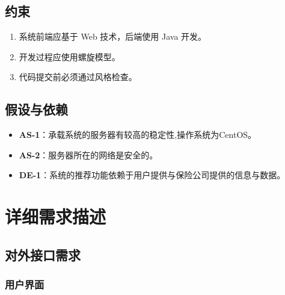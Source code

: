 \documentclass[a4paper]{ctexart}
\begin{document}
\subsection{约束}

\begin{enumerate}[label=CON\arabic*.]
  \item 系统前端应基于 Web 技术，后端使用 Java 开发。
  \item 开发过程应使用螺旋模型。
  \item 代码提交前必须通过风格检查。
\end{enumerate}

\subsection{假设与依赖}

\begin{itemize}
  \item \textbf{AS-1}：承载系统的服务器有较高的稳定性,操作系统为CentOS。
  \item \textbf{AS-2}：服务器所在的网络是安全的。
  \item \textbf{DE-1}：系统的推荐功能依赖于用户提供与保险公司提供的信息与数据。
\end{itemize}

\section{详细需求描述}

\subsection{对外接口需求}

\subsubsection{用户界面}
\end{document}
